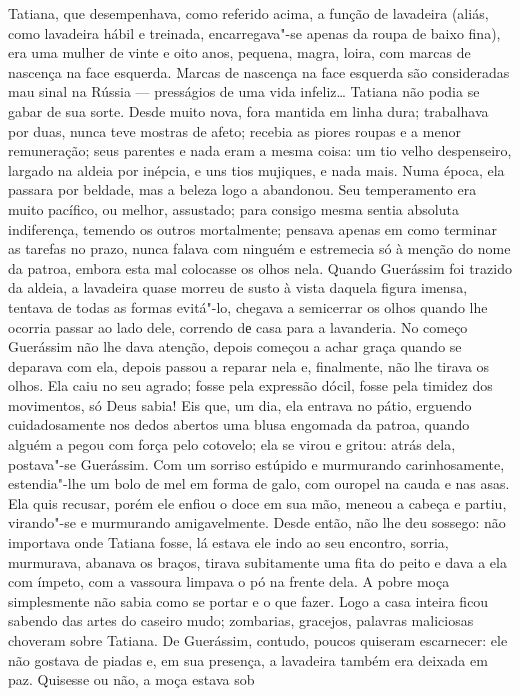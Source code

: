 Tatiana, que desempenhava, como referido acima, a função de lavadeira
(aliás, como lavadeira hábil e treinada, encarregava"-se apenas da roupa
de baixo fina), era uma mulher de vinte e oito anos, pequena, magra,
loira, com marcas de nascença na face esquerda. Marcas de nascença na
face esquerda são consideradas mau sinal na Rússia --- presságios de uma
vida infeliz\ldots{} Tatiana não podia se gabar de sua sorte. Desde muito
nova, fora mantida em linha dura; trabalhava por duas, nunca teve
mostras de afeto; recebia as piores roupas e a menor remuneração; seus
parentes e nada eram a mesma coisa: um tio velho despenseiro, largado na
aldeia por inépcia, e uns tios mujiques, e nada mais. Numa época, ela
passara por beldade, mas a beleza logo a abandonou. Seu temperamento era
muito pacífico, ou melhor, assustado; para consigo mesma sentia absoluta
indiferença, temendo os outros mortalmente; pensava apenas em como
terminar as tarefas no prazo, nunca falava com ninguém e estremecia só à
menção do nome da patroa, embora esta mal colocasse os olhos nela.
Quando Guerássim foi trazido da aldeia, a lavadeira quase morreu de
susto à vista daquela figura imensa, tentava de todas as formas
evitá"-lo, chegava a semicerrar os olhos quando lhe ocorria passar ao
lado dele, correndo dе casa para a lavanderia. No começo Guerássim não
lhe dava atenção, depois começou a achar graça quando se deparava com
ela, depois passou a reparar nela e, finalmente, não lhe tirava os
olhos. Ela caiu no seu agrado; fosse pela expressão dócil, fosse pela
timidez dos movimentos, só Deus sabia! Eis que, um dia, ela entrava no
pátio, erguendo cuidadosamente nos dedos abertos uma blusa engomada da
patroa, quando alguém a pegou com força pelo cotovelo; ela se virou e
gritou: atrás dela, postava"-se Guerássim. Com um sorriso estúpido e
murmurando carinhosamente, estendia"-lhe um bolo de mel em forma de galo,
com ouropel na cauda e nas asas. Ela quis recusar, porém ele enfiou o
doce em sua mão, meneou a cabeça e partiu, virando"-se e murmurando
amigavelmente. Desde então, não lhe deu sossego: não importava onde
Tatiana fosse, lá estava ele indo ao seu encontro, sorria, murmurava,
abanava os braços, tirava subitamente uma fita do peito e dava a ela com
ímpeto, com a vassoura limpava o pó na frente dela. A pobre moça
simplesmente não sabia como se portar e o que fazer. Logo a casa inteira
ficou sabendo das artes do caseiro mudo; zombarias, gracejos, palavras
maliciosas choveram sobre Tatiana. De Guerássim, contudo, poucos
quiseram escarnecer: ele não gostava de piadas e, em sua presença, a
lavadeira também era deixada em paz. Quisesse ou não, a moça estava sob
